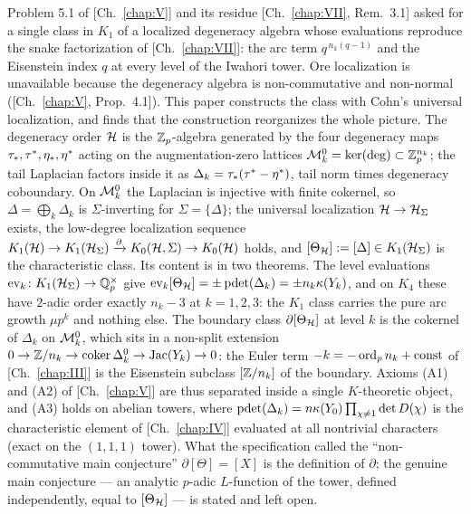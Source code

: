 \begin{chapterabstract}
Problem 5.1 of [Ch.~\ref{chap:V}] and its residue [Ch.~\ref{chap:VII}, Rem.~3.1] asked for a single class in $K_1$ of a
localized degeneracy algebra whose evaluations reproduce the snake factorization of [Ch.~\ref{chap:VII}]:
the arc term $q^{\,n_k(q-1)}$ and the Eisenstein index $q$ at every level of the Iwahori tower.
Ore localization is unavailable because the degeneracy algebra is non-commutative and
non-normal ([Ch.~\ref{chap:V}, Prop.~4.1]). This paper constructs the class with Cohn's universal
localization, and finds that the construction reorganizes the whole picture. The degeneracy
order $\mathcal{H}$ is the $\mathbb{Z}_p$-algebra generated by the four degeneracy maps $\tau_*,\tau^*,\eta_*,\eta^*$
acting on the augmentation-zero lattices $\mathcal{M}^{0}_k=\ker(\deg)\subset\mathbb{Z}_p^{n_k}$; the tail
Laplacian factors inside it as $\Delta_k=\tau_*(\tau^*-\eta^*)$, tail norm times degeneracy
coboundary. On $\mathcal{M}^{0}_k$ the Laplacian is injective with finite cokernel, so
$\Delta=\bigoplus_k\Delta_k$ is $\Sigma$-inverting for $\Sigma=\{\Delta\}$; the universal
localization $\mathcal{H}\to\mathcal{H}_\Sigma$ exists, the low-degree localization sequence
$K_1(\mathcal{H})\to K_1(\mathcal{H}_\Sigma)\xrightarrow{\partial}K_0(\mathcal{H},\Sigma)\to K_0(\mathcal{H})$ holds, and
$[\Theta_{\mathcal{H}}]:=[\Delta]\in K_1(\mathcal{H}_\Sigma)$ is the characteristic class. Its content is in two
theorems. The level evaluations $\operatorname{ev}_k\colon K_1(\mathcal{H}_\Sigma)\to\mathbb{Q}_p^{\times}$ give
$\operatorname{ev}_k[\Theta_{\mathcal{H}}]=\pm\operatorname{pdet}(\Delta_k)=\pm n_k\kappa(Y_k)$, and on $K_4$ these have
$2$-adic order exactly $n_k-3$ at $k=1,2,3$: the $K_1$ class carries the pure arc growth
$\mu p^{k}$ and nothing else. The boundary class $\partial[\Theta_{\mathcal{H}}]$ at level $k$ is the
cokernel of $\Delta_k$ on $\mathcal{M}^{0}_k$, which sits in a non-split extension
$0\to\mathbb{Z}/n_k\to\operatorname{coker}\Delta_k^{0}\to\operatorname{Jac}(Y_k)\to0$: the Euler term $-k=-\operatorname{ord}_pn_k+\mathrm{const}$
of [Ch.~\ref{chap:III}] is the Eisenstein subclass $[\mathbb{Z}/n_k]$ of the boundary. Axioms (A1) and (A2) of [Ch.~\ref{chap:V}]
are thus separated inside a single $K$-theoretic object, and (A3) holds on abelian towers,
where $\operatorname{pdet}(\Delta_k)=n\kappa(Y_0)\prod_{\chi\ne1}\det D(\chi)$ is the characteristic
element of [Ch.~\ref{chap:IV}] evaluated at all nontrivial characters (exact on the $(1,1,1)$ tower). What
the specification called the ``non-commutative main conjecture'' $\partial[\Theta]=[X]$ is
the definition of $\partial$; the genuine main conjecture --- an analytic $p$-adic
$L$-function of the tower, defined independently, equal to $[\Theta_{\mathcal{H}}]$ --- is stated and
left open.
\end{chapterabstract}

